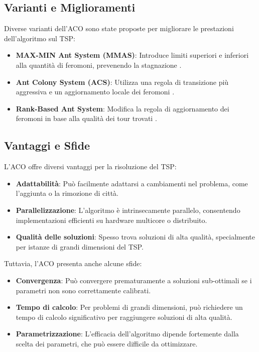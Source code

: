 \subsection{Varianti e Miglioramenti}

Diverse varianti dell'\gls{ACO} sono state proposte per migliorare le prestazioni dell'algoritmo sul \gls{TSP}:

\begin{itemize}
	\item \textbf{MAX-MIN Ant System (\gls{MMAS})}: Introduce limiti superiori e inferiori alla quantità di feromoni, prevenendo la stagnazione \cite{stutzle2000max}.
	\item \textbf{Ant Colony System (\gls{ACS})}: Utilizza una regola di transizione più aggressiva e un aggiornamento locale dei feromoni \cite{dorigo1997ant}.
	\item \textbf{Rank-Based Ant System}: Modifica la regola di aggiornamento dei feromoni in base alla qualità dei tour trovati \cite{bullnheimer1999rank}.
\end{itemize}

\subsection{Vantaggi e Sfide}

L'ACO offre diversi vantaggi per la risoluzione del \gls{TSP}:

\begin{itemize}
	\item \textbf{Adattabilità}: Può facilmente adattarsi a cambiamenti nel problema, come l'aggiunta o la rimozione di città.
	\item \textbf{Parallelizzazione}: L'algoritmo è intrinsecamente parallelo, consentendo implementazioni efficienti su hardware multicore o distribuito.
	\item \textbf{Qualità delle soluzioni}: Spesso trova soluzioni di alta qualità, specialmente per istanze di grandi dimensioni del \gls{TSP}.
\end{itemize}

Tuttavia, l'\gls{ACO} presenta anche alcune sfide:

\begin{itemize}
	\item \textbf{Convergenza}: Può convergere prematuramente a soluzioni sub-ottimali se i parametri non sono correttamente calibrati.
	\item \textbf{Tempo di calcolo}: Per problemi di grandi dimensioni, può richiedere un tempo di calcolo significativo per raggiungere soluzioni di alta qualità.
	\item \textbf{Parametrizzazione}: L'efficacia dell'algoritmo dipende fortemente dalla scelta dei parametri, che può essere difficile da ottimizzare.
\end{itemize}


